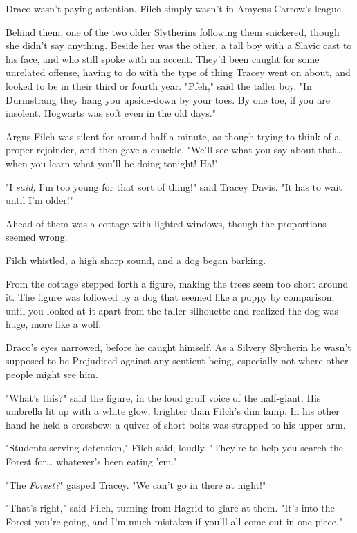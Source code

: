 Draco wasn't paying attention. Filch simply wasn't in Amycus Carrow's league.

Behind them, one of the two older Slytherins following them snickered, though
she didn't say anything. Beside her was the other, a tall boy with a Slavic
cast to his face, and who still spoke with an accent. They'd been caught for
some unrelated offense, having to do with the type of thing Tracey went on
about, and looked to be in their third or fourth year. "Pfeh," said the taller
boy. "In Durmstrang they hang you upside-down by your toes. By one toe, if you
are insolent. Hogwarts was soft even in the old days."

Argus Filch was silent for around half a minute, as though trying to think of a
proper rejoinder, and then gave a chuckle. "We'll see what you say about
that{\ldots} when you learn what you'll be doing tonight! Ha!"

"I \emph{said,} I'm too young for that sort of thing!" said Tracey Davis. "It
has to wait until I'm older!"

Ahead of them was a cottage with lighted windows, though the proportions seemed
wrong.

Filch whistled, a high sharp sound, and a dog began barking.

From the cottage stepped forth a figure, making the trees seem too short around
it. The figure was followed by a dog that seemed like a puppy by comparison,
until you looked at it apart from the taller silhouette and realized the dog
was huge, more like a wolf.

Draco's eyes narrowed, before he caught himself. As a Silvery Slytherin he
wasn't supposed to be Prejudiced against any sentient being, especially not
where other people might see him.

"What's this?" said the figure, in the loud gruff voice of the half-giant. His
umbrella lit up with a white glow, brighter than Filch's dim lamp. In his other
hand he held a crossbow; a quiver of short bolts was strapped to his upper arm.

"Students serving detention," Filch said, loudly. "They're to help you search
the Forest for… whatever's been eating 'em."

"The \emph{Forest?}" gasped Tracey. "We can't go in there at night!"

"That's right," said Filch, turning from Hagrid to glare at them. "It's into
the Forest you're going, and I'm much mistaken if you'll all come out in one
piece."

